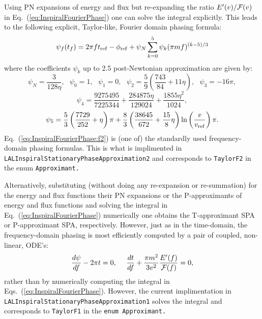 Using PN expansions of energy and flux but
re-expanding the ratio $E'(v)/{\cal F}(v)$ in Eq.~(\ref{eq:InspiralFourierPhase}) one
can solve the integral explicitly. This leads to the following
explicit, Taylor-like, Fourier domain phasing formula:
\begin{equation}
 \psi_f(t_f) = 2 \pi f t_{\rm ref} - \phi_{\rm ref} + 
 \psi_N \sum_{k=0}^5 {\psi}_k (\pi m f)^{(k-5)/3} 
\label{eq:InspiralFourierPhase:f2}
\end{equation}
where the coefficients ${\psi}_k$ up to 2.5 post-Newtonian approximation are given by:
$$\psi_N =  \frac{3}{128\eta},\ \ \ \psi_0 = 1,\ \ \ \psi_1 = 0,\ \ \   
\psi_2 =  \frac{5}{9} \left ( \frac{743}{84} + 11\eta\right ),\ \ \ 
\psi_3 =  -16\pi,$$
$$\psi_4 =  \frac{9275495}{7225344}+\frac{284875\eta}{129024 } + \frac{1855\eta^2}{1024},$$
$$\psi_5 =  \frac{5}{3} \left ( \frac{7729}{252} + \eta \right ) \pi +
   \frac{8}{3} \left ( \frac{38645}{672} + \frac{15}{8} \eta \right ) 
	\ln \left ( \frac{v}{v_{\rm ref}} \right )\pi.$$
Eq.~(\ref{eq:InspiralFourierPhase:f2}) is (one of) the  standardly used frequency-domain phasing formulas.
This is what is implimented in {\tt LALInspiralStationaryPhaseApproximation2}
and corresponds to \texttt{TaylorF2} in the enum \texttt{Approximant.}

Alternatively, substituting (without doing any re-expansion or re-summation) 
for the energy and flux functions their PN expansions
or the P-approximants of energy and flux functions 
and solving the integral in Eq.~(\ref{eq:InspiralFourierPhase}) numerically
one obtains the T-approximant SPA or P-approximant SPA, respectively.
However, just as in the time-domain, the frequency-domain phasing is 
most efficiently computed by a pair of coupled, non-linear, ODE's:
\begin{equation}
\frac{d\psi}{df} - 2\pi t = 0, \ \ \ \
\frac{dt}{df} + \frac{\pi m^2}{3v^2} \frac{E'(f)}{{\cal F}(f)} = 0,
\label {eq:frequencyDomainODE}
\end{equation}
rather  than by numerically computing the integral in  
Eqs.~(\ref{eq:InspiralFourierPhase}).  However, the current implimentation 
in {\tt LALInspiralStationaryPhaseApproximation1} solves the integral 
and corresponds to \texttt{TaylorF1} in the  \texttt{enum Approximant.}

